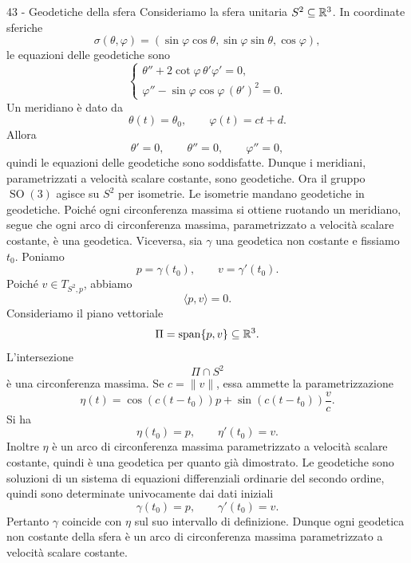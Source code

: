 \documentclass[a4paper]{article}
\begin{document}
\begin{snippetsolution}{43 - Geodetiche della sfera}
    Consideriamo la sfera unitaria \(S^2\subseteq\mathbb{R}^3\). In coordinate sferiche
    \[
        \sigma(\theta,\varphi)
        =
        (\sin\varphi\cos\theta,\sin\varphi\sin\theta,\cos\varphi),
    \]
    le equazioni delle geodetiche sono
    \[
        \begin{cases}
            \theta''+2\cot\varphi\,\theta'\varphi'=0,\\
            \varphi''-\sin\varphi\cos\varphi\,(\theta')^2=0.
        \end{cases}
    \]
    Un meridiano è dato da
    \[
        \theta(t)=\theta_0,
        \qquad
        \varphi(t)=ct+d.
    \]
    Allora
    \[
        \theta'=0,
        \qquad
        \theta''=0,
        \qquad
        \varphi''=0,
    \]
    quindi le equazioni delle geodetiche sono soddisfatte. Dunque i meridiani, parametrizzati a velocità scalare costante, sono geodetiche.
    Ora il gruppo \(\operatorname{SO}(3)\) agisce su \(S^2\) per isometrie. Le isometrie mandano geodetiche in geodetiche. Poiché ogni circonferenza massima si ottiene ruotando un meridiano, segue che ogni arco di circonferenza massima, parametrizzato a velocità scalare costante, è una geodetica.
    Viceversa, sia \(\gamma\) una geodetica non costante e fissiamo \(t_0\). Poniamo
    \[
        p=\gamma(t_0),
        \qquad
        v=\gamma'(t_0).
    \]
    Poiché \(v\in T_{S^2,p}\), abbiamo
    \[
        \langle p,v\rangle=0.
    \]
    Consideriamo il piano vettoriale
    \[
        \Pi=\operatorname{span}\{p,v\}\subseteq\mathbb{R}^3.
    \]
    L'intersezione
    \[
        \Pi\cap S^2
    \]
    è una circonferenza massima. Se \(c=\|v\|\), essa ammette la parametrizzazione
    \[
        \eta(t)
        =
        \cos(c(t-t_0))p
        +
        \sin(c(t-t_0))\frac{v}{c}.
    \]
    Si ha
    \[
        \eta(t_0)=p,
        \qquad
        \eta'(t_0)=v.
    \]
    Inoltre \(\eta\) è un arco di circonferenza massima parametrizzato a velocità scalare costante, quindi è una geodetica per quanto già dimostrato.
    Le geodetiche sono soluzioni di un sistema di equazioni differenziali ordinarie del secondo ordine, quindi sono determinate univocamente dai dati iniziali
    \[
        \gamma(t_0)=p,
        \qquad
        \gamma'(t_0)=v.
    \]
    Pertanto \(\gamma\) coincide con \(\eta\) sul suo intervallo di definizione. Dunque ogni geodetica non costante della sfera è un arco di circonferenza massima parametrizzato a velocità scalare costante.
\end{snippetsolution}
\end{document}
